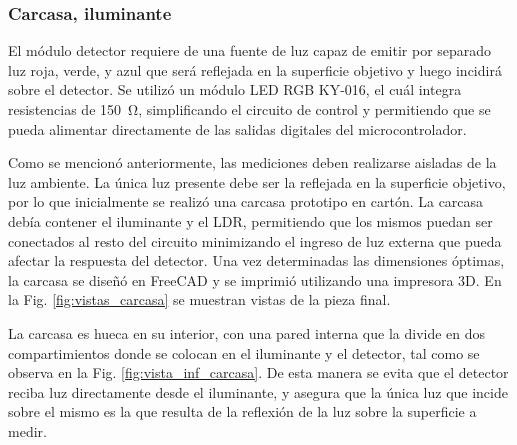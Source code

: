 \documentclass[12pt,a4paper,twoside,fleqn]{article}
\begin{document}
\subsubsection*{Carcasa, iluminante}
El módulo detector requiere de una fuente de luz capaz de emitir por separado luz roja, verde, y azul que será reflejada en la superficie objetivo y luego incidirá sobre el detector. Se utilizó un módulo LED RGB KY-016, el cuál integra resistencias de \qty{150}{\ohm}, simplificando el circuito de control y permitiendo que se pueda alimentar directamente de las salidas digitales del microcontrolador. 

Como se mencionó anteriormente, las mediciones deben realizarse aisladas de la luz ambiente. La única luz presente debe ser la reflejada en la superficie objetivo, por lo que inicialmente se realizó una carcasa prototipo en cartón. La carcasa debía contener el iluminante y el LDR, permitiendo que los mismos puedan ser conectados al resto del circuito minimizando el ingreso de luz externa que pueda afectar la respuesta del detector. Una vez determinadas las dimensiones óptimas, la carcasa se diseñó en FreeCAD y se imprimió utilizando una impresora 3D. En la Fig. \ref{fig:vistas_carcasa} se muestran vistas de la pieza final.

La carcasa es hueca en su interior, con una pared interna que la divide en dos compartimientos donde se colocan en el iluminante y el detector, tal como se observa en la Fig. \ref{fig:vista_inf_carcasa}. De esta manera se evita que el detector reciba luz directamente desde el iluminante, y asegura que la única luz que incide sobre el mismo es la que resulta de la reflexión de la luz sobre la superficie a medir.
\end{document}
